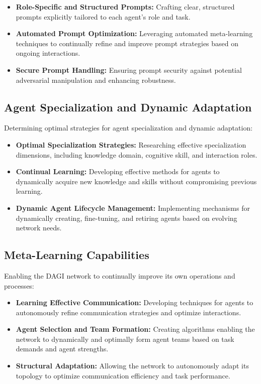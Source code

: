 \documentclass[12pt]{amsart}
\begin{document}
\begin{itemize}
    \item \textbf{Role-Specific and Structured Prompts:} Crafting clear, structured prompts explicitly tailored to each agent’s role and task.
    \item \textbf{Automated Prompt Optimization:} Leveraging automated meta-learning techniques to continually refine and improve prompt strategies based on ongoing interactions.
    \item \textbf{Secure Prompt Handling:} Ensuring prompt security against potential adversarial manipulation and enhancing robustness.
\end{itemize}

\subsection{Agent Specialization and Dynamic Adaptation}

Determining optimal strategies for agent specialization and dynamic adaptation:

\begin{itemize}
    \item \textbf{Optimal Specialization Strategies:} Researching effective specialization dimensions, including knowledge domain, cognitive skill, and interaction roles.
    \item \textbf{Continual Learning:} Developing effective methods for agents to dynamically acquire new knowledge and skills without compromising previous learning.
    \item \textbf{Dynamic Agent Lifecycle Management:} Implementing mechanisms for dynamically creating, fine-tuning, and retiring agents based on evolving network needs.
\end{itemize}

\subsection{Meta-Learning Capabilities}

Enabling the DAGI network to continually improve its own operations and processes:

\begin{itemize}
    \item \textbf{Learning Effective Communication:} Developing techniques for agents to autonomously refine communication strategies and optimize interactions.
    \item \textbf{Agent Selection and Team Formation:} Creating algorithms enabling the network to dynamically and optimally form agent teams based on task demands and agent strengths.
    \item \textbf{Structural Adaptation:} Allowing the network to autonomously adapt its topology to optimize communication efficiency and task performance.
\end{itemize}
\end{document}
